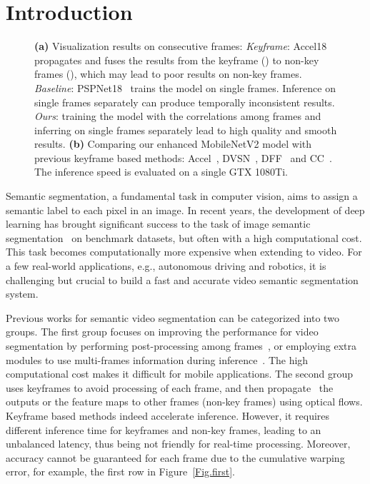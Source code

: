 \documentclass[runningheads]{llncs}
\begin{document}
\section{Introduction}
\begin{figure}[thb]
\centering  {}
\caption{\textbf{(a)} Visualization results on consecutive frames: \textit{Keyframe}: 
Accel18~\cite{jain2019accel} propagates and fuses the results from the keyframe () to 
non-key
frames (), which may lead to
poor results on non-key
frames. \textit{Baseline}: PSPNet18~\cite{zhao2017pyramid} trains the model on single frames. Inference on single frames separately 
can
produce temporally  inconsistent results. 
\textit{Ours}: training the model with the correlations among frames and inferring on single frames separately lead to
high quality and smooth results.
\textbf{(b)}
Comparing our enhanced MobileNetV2 model with previous keyframe based methods: Accel~\cite{jain2019accel}, DVSN~\cite{xu2018dynamic}, DFF~\cite{zhu2017deep} and  CC~\cite{shelhamer2016clockwork}. The inference speed is evaluated on a single GTX 1080Ti.}

\end{figure}
Semantic segmentation, a fundamental task in computer vision, aims to assign a semantic label to each pixel in an image. In recent years, the development of deep learning has brought significant success to the task of image semantic segmentation~\cite{zhao2017pyramid,tian2019decoders,chen2018deeplab} on benchmark datasets, but often with a high computational cost. This task 
becomes 
computationally 
more expensive when extending to video.
For a few real-world applications, e.g., autonomous driving and robotics, it is challenging but crucial to build a fast and accurate video semantic segmentation system.



Previous works for semantic video segmentation can be categorized into two groups.
The first group focuses on improving the performance for video segmentation by performing
post-processing among frames~\cite{liu2017surveillance}, or employing extra modules to use multi-frames information during inference~\cite{gadde2017semantic}. The high computational cost makes it difficult for mobile applications.
The second group uses keyframes to avoid processing of each frame, and 
then 
propagate~\cite{zhu2017deep,zhu2018towards,xu2018dynamic} the outputs or the feature maps to other frames (non-key
frames)
using 
optical flows. Keyframe based methods 
indeed accelerate inference. 
However, it requires different inference time for keyframes and 
non-key
frames, 
leading to an unbalanced latency, thus being not friendly for real-time processing. 
Moreover, accuracy cannot be guaranteed for each frame 
due to the cumulative warping error, for example, the first row in Figure~\ref{Fig.first}.
\end{document}
